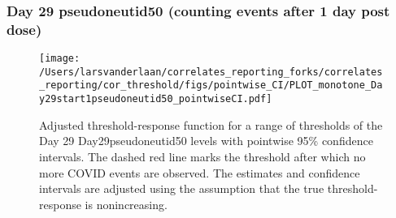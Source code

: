 \documentclass[]{article}
\begin{document}
\clearpage
\clearpage

\clearpage

\hypertarget{day-29-pseudoneutid50-counting-events-after-1-day-post-dose-1}{%
\subsubsection{Day 29 pseudoneutid50 (counting events after 1 day post
dose)}\label{day-29-pseudoneutid50-counting-events-after-1-day-post-dose-1}}

\begin{figure}[H]
\centering
\texttt{[image: /Users/larsvanderlaan/correlates\_reporting\_forks/correlates\_reporting/cor\_threshold/figs/pointwise\_CI/PLOT\_monotone\_Day29start1pseudoneutid50\_pointwiseCI.pdf]}
\caption{Adjusted threshold-response function for a range of thresholds of the
  Day 29 Day29pseudoneutid50 levels with pointwise 95\% confidence intervals. The dashed red line marks the threshold after which no more COVID events are observed. The estimates and confidence intervals are adjusted using the assumption that the true threshold-response is nonincreasing.}
\end{figure}
\end{document}
